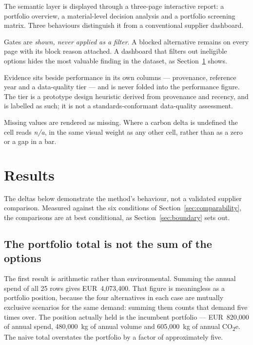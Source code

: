 \documentclass[10pt,twocolumn,a4paper]{article}
\newcommand{\co}{CO\textsubscript{2}e}
\newcommand{\eur}[1]{EUR~#1}
\begin{document}
The semantic layer is displayed through a three-page interactive report: a
portfolio overview, a material-level decision analysis and a portfolio screening
matrix. Three behaviours distinguish it from a conventional supplier dashboard.

Gates are \emph{shown, never applied as a filter}. A blocked alternative remains
on every page with its block reason attached. A dashboard that filters out
ineligible options hides the most valuable finding in the dataset, as
Section~\ref{sec:results} shows.

Evidence sits beside performance in its own columns --- provenance, reference
year and a data-quality tier --- and is never folded into the performance figure.
The tier is a prototype design heuristic derived from provenance and recency, and
is labelled as such; it is not a standards-conformant data-quality assessment.

Missing values are rendered as missing. Where a carbon delta is undefined the cell
reads \emph{n/a}, in the same visual weight as any other cell, rather than as a
zero or a gap in a bar.

\section{Results}
\label{sec:results}

The deltas below demonstrate the method's behaviour, not a validated supplier
comparison. Measured against the six conditions of
Section~\ref{sec:comparability}, the comparisons are at best conditional, as
Section~\ref{sec:boundary} sets out.

\subsection{The portfolio total is not the sum of the options}

The first result is arithmetic rather than environmental. Summing the annual spend
of all 25 rows gives \eur{4{,}073{,}400}. That figure is meaningless as a
portfolio position, because the four alternatives in each case are mutually
exclusive scenarios for the same demand: summing them counts that demand five
times over. The position actually held is the incumbent portfolio ---
\eur{820{,}000} of annual spend, 480{,}000~kg of annual volume and 605{,}000~kg
of annual \co{}. The naive total overstates the portfolio by a factor of
approximately five.
\end{document}
